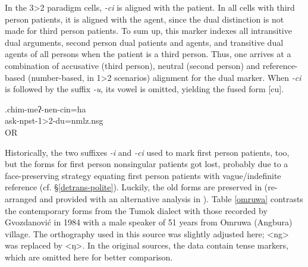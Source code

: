 In the 3>2 paradigm cells, \emph{-ci} is aligned with the patient. In all cells with third person patients, it is aligned with the agent, since the dual distinction is not made for third person patients. To sum up, this marker indexes all intransitive dual arguments,  second person dual patients and agents, and transitive dual agents of all persons when the patient is a third person. Thus, one arrives at a combination of accusative (third person), neutral (second person) and reference-based (number-based, in 1>2 scenarios) alignment for the dual marker. When \emph{-ci} is followed by the suffix \emph{-u}, its vowel is omitted, yielding the fused form [cu].

\exg.chim-meʔ-nen-cin=ha\\
ask{\sc -npst-1>2-du=nmlz.nsg}\\
 OR\\

Historically, the two suffixes \emph{-i} and \emph{-ci} used to mark first person patients, too, but the forms for first person nonsingular patients got lost, probably due to a face-preserving strategy equating first person patients with vague/indefinite reference (cf. §\ref{detrans-polite}). Luckily, the old forms are preserved in \citet{Gvozdanovic1987How} (re-arranged and provided with an alternative analysis in \citet{Driem1994The-Yakkha}). Table \ref{omruwa} contrasts the contemporary forms from the Tumok dialect with those recorded by Gvozdanović in 1984 with a male speaker of 51 years from Omruwa (Angbura) village. The orthography used in this source was slightly adjusted here; <ng> was replaced  by <ŋ>.  In the original sources, the data contain tense markers, which are omitted here for better comparison. 


